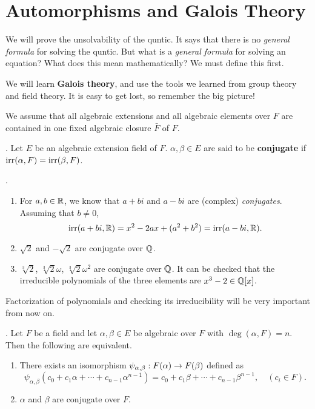 \chapter{Automorphisms and Galois Theory}

We will prove the unsolvability of the quntic. It says that there is no \textit{general formula} for solving the quntic. But what is a \textit{general formula} for solving an equation? What does this mean mathematically? We must define this first.

We will learn \textbf{Galois theory}, and use the tools we learned from group theory and field theory. It is easy to get lost, so remember the big picture!

We assume that all algebraic extensions and all algebraic elements over \(F\) are contained in one fixed algebraic closure \(\bar{F}\) of \(F\).

\setcounter{topic}{47}

.  Let \(E\) be an algebraic extension field of \(F\). \(\alpha, \beta \in E\) are said to be \textbf{conjugate} if \(\mathrm{irr}(\alpha, F) = \mathrm{irr}(\beta, F)\).

\ex.
\begin{enumerate}
    \item For \(a, b \in \mathbb{R}\), we know that \(a+bi\) and \(a-bi\) are (complex) \textit{conjugates}. Assuming that \(b \neq 0\),
          \[
              \mathrm{irr}(a + bi, \mathbb{R}) = x^2 - 2ax + (a^2 + b^2) = \mathrm{irr}(a - bi, \mathbb{R}).
          \]

    \item \(\sqrt{2}\) and \(-\sqrt{2}\) are conjugate over \(\mathbb{Q}\).
    \item \(\sqrt[3]{2}\), \(\sqrt[3]{2}\omega\), \(\sqrt[3]{2}\omega^2\) are conjugate over \(\mathbb{Q}\). It can be checked that the irreducible polynomials of the three elements are \(x^3 - 2 \in \mathbb{Q}[x]\).
\end{enumerate}

\rmk Factorization of polynomials and checking its irreducibility will be very important from now on.

\pagebreak

\thm.  Let \(F\) be a field and let \(\alpha, \beta \in E\) be algebraic over \(F\) with \(\deg(\alpha, F) = n\). Then the following are equivalent.
\begin{enumerate}
    \item There exists an isomorphism \(\psi_{\alpha, \beta} : F(\alpha) \rightarrow F(\beta)\) defined as
          \[
              \psi_{\alpha, \beta}(c_0 + c_1 \alpha + \cdots + c_{n-1} \alpha^{n-1}) = c_0 + c_1\beta + \cdots + c_{n-1} \beta^{n-1}, \quad (c_i \in F).
          \]

    \item \(\alpha\) and \(\beta\) are conjugate over \(F\).
\end{enumerate}

